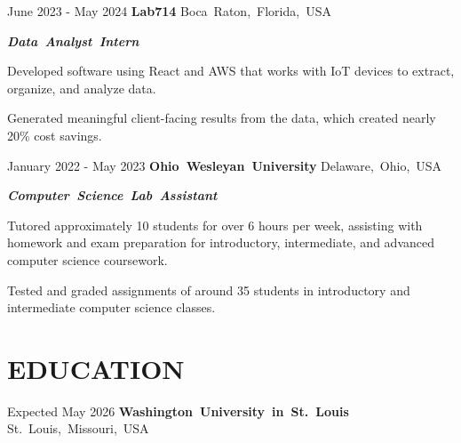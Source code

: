 \documentclass[10pt, letterpaper]{article}
\begin{document}
\vspace{\entrySpacing}\begin{twocolentry}{June 2023 - May 2024}
    \mbox{\textbf{Lab714}}
    \kern {}
    \AND
    \kern {}
    \mbox{Boca Raton, Florida, USA}
\end{twocolentry}

\vspace{\highlightSpacing}
\mbox{\textit{\textbf{Data Analyst Intern}}}
\begin{onecolentry}
    \begin{highlightsforbulletentries}
        \item Developed software using React and AWS that works with IoT devices to extract, organize, and analyze data.
        \item Generated meaningful client-facing results from the data, which created nearly 20\% cost savings.
    \end{highlightsforbulletentries}
\end{onecolentry}

\vspace{\entrySpacing}\begin{twocolentry}{January 2022 - May 2023}
    \mbox{\textbf{Ohio Wesleyan University}}
    \kern {}
    \AND
    \kern {}
    \mbox{Delaware, Ohio, USA}
\end{twocolentry}

\vspace{\highlightSpacing}
\mbox{\textit{\textbf{Computer Science Lab Assistant}}}
\begin{onecolentry}
    \begin{highlightsforbulletentries}
        \item Tutored approximately 10 students for over 6 hours per week, assisting with homework and exam preparation for introductory, intermediate, and advanced computer science coursework.
        \item Tested and graded assignments of around 35 students in introductory and intermediate computer science classes.
    \end{highlightsforbulletentries}
\end{onecolentry}

\section{EDUCATION}

\begin{twocolentry}{Expected May 2026}
    \mbox{\textbf{Washington University in St. Louis}}
    \kern {}
    \AND
    \kern {}
    \mbox{St. Louis, Missouri, USA}
\end{twocolentry}
\end{document}
